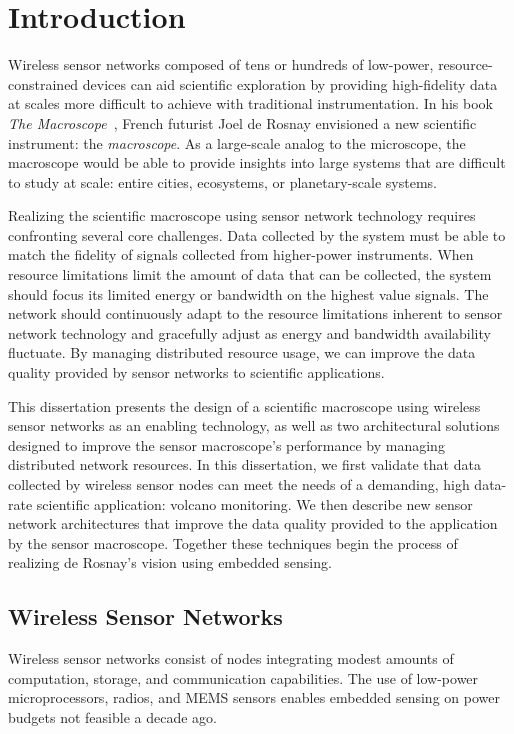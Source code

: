 \chapter{Introduction}
\label{chap-introduction}

Wireless sensor networks composed of tens or hundreds of low-power,
resource-constrained devices can aid scientific exploration by providing
high-fidelity data at scales more difficult to achieve with traditional
instrumentation. In his book \textit{The Macroscope}~\cite{rosnay79}, French
futurist Joel de Rosnay envisioned a new scientific instrument: the
\textit{macroscope}. As a large-scale analog to the microscope, the
macroscope would be able to provide insights into large systems that are
difficult to study at scale: entire cities, ecosystems, or planetary-scale
systems.

Realizing the scientific macroscope using sensor network technology requires
confronting several core challenges. Data collected by the system must be
able to match the fidelity of signals collected from higher-power
instruments. When resource limitations limit the amount of data that can be
collected, the system should focus its limited energy or bandwidth on the
highest value signals. The network should continuously adapt to the resource
limitations inherent to sensor network technology and gracefully adjust as
energy and bandwidth availability fluctuate. By managing distributed resource
usage, we can improve the data quality provided by sensor networks to
scientific applications.

This dissertation presents the design of a scientific macroscope using
wireless sensor networks as an enabling technology, as well as two
architectural solutions designed to improve the sensor macroscope's
performance by managing distributed network resources. In this dissertation,
we first validate that data collected by wireless sensor nodes can meet the
needs of a demanding, high data-rate scientific application: volcano
monitoring. We then describe new sensor network architectures that improve
the data quality provided to the application by the sensor macroscope.
Together these techniques begin the process of realizing de Rosnay's vision
using embedded sensing.

\section{Wireless Sensor Networks}

Wireless sensor networks consist of nodes integrating modest amounts of
computation, storage, and communication capabilities. The use of low-power
microprocessors, radios, and MEMS sensors enables embedded sensing on power
budgets not feasible a decade ago.

